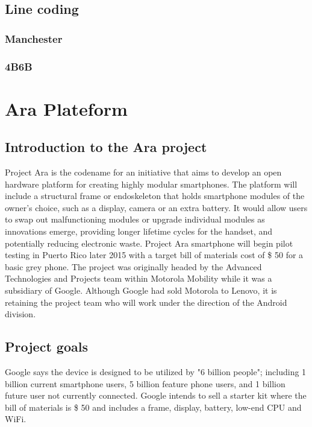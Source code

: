 \subsection{Line coding}

\subsubsection{Manchester}

\subsubsection{4B6B}



\section{Ara Plateform}
\subsection{Introduction to the Ara project}

Project Ara is the codename for an initiative that aims to develop an open hardware platform for creating highly modular smartphones. The platform will include a structural frame or endoskeleton that holds smartphone modules of the owner's choice, such as a display, camera or an extra battery. It would allow users to swap out malfunctioning modules or upgrade individual modules as innovations emerge, providing longer lifetime cycles for the handset, and potentially reducing electronic waste. Project Ara smartphone will begin pilot testing in Puerto Rico later 2015 with a target bill of materials cost of \$ 50 for a basic grey phone. The project was originally headed by the Advanced Technologies and Projects team within Motorola Mobility while it was a subsidiary of Google. Although Google had sold Motorola to Lenovo, it is retaining the project team who will work under the direction of the Android division.

\subsection{Project goals}
Google says the device is designed to be utilized by "6 billion people"; including 1 billion current smartphone users, 5 billion feature phone users, and 1 billion future user not currently connected. Google intends to sell a starter kit where the bill of materials is \$ 50 and includes a frame, display, battery, low-end CPU and WiFi.

